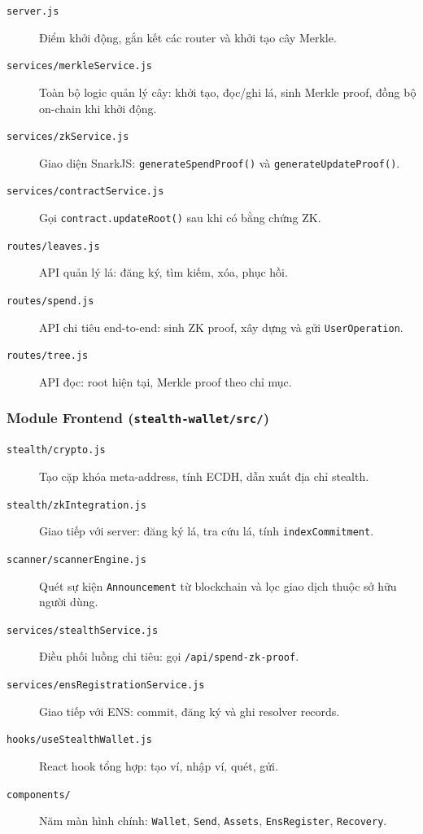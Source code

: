 \documentclass[../DoAn.tex]{subfiles}
\begin{document}
\begin{description}
    \item[\texttt{server.js}] Điểm khởi động, gắn kết các router và khởi tạo cây Merkle.
    \item[\texttt{services/merkleService.js}] Toàn bộ logic quản lý cây: khởi tạo, đọc/ghi lá, sinh Merkle proof, đồng bộ on-chain khi khởi động.
    \item[\texttt{services/zkService.js}] Giao diện SnarkJS: \texttt{generateSpendProof()} và \texttt{generateUpdateProof()}.
    \item[\texttt{services/contractService.js}] Gọi \texttt{contract.updateRoot()} sau khi có bằng chứng ZK.
    \item[\texttt{routes/leaves.js}] API quản lý lá: đăng ký, tìm kiếm, xóa, phục hồi.
    \item[\texttt{routes/spend.js}] API chi tiêu end-to-end: sinh ZK proof, xây dựng và gửi \texttt{UserOperation}.
    \item[\texttt{routes/tree.js}] API đọc: root hiện tại, Merkle proof theo chỉ mục.
\end{description}

\subsubsection{Module Frontend (\texttt{stealth-wallet/src/})}

\begin{description}
    \item[\texttt{stealth/crypto.js}] Tạo cặp khóa meta-address, tính ECDH, dẫn xuất địa chỉ stealth.
    \item[\texttt{stealth/zkIntegration.js}] Giao tiếp với server: đăng ký lá, tra cứu lá, tính \texttt{indexCommitment}.
    \item[\texttt{scanner/scannerEngine.js}] Quét sự kiện \texttt{Announcement} từ blockchain và lọc giao dịch thuộc sở hữu người dùng.
    \item[\texttt{services/stealthService.js}] Điều phối luồng chi tiêu: gọi \texttt{/api/spend-zk-proof}.
    \item[\texttt{services/ensRegistrationService.js}] Giao tiếp với ENS: commit, đăng ký và ghi resolver records.
    \item[\texttt{hooks/useStealthWallet.js}] React hook tổng hợp: tạo ví, nhập ví, quét, gửi.
    \item[\texttt{components/}] Năm màn hình chính: \texttt{Wallet}, \texttt{Send}, \texttt{Assets}, \texttt{EnsRegister}, \texttt{Recovery}.
\end{description}
\end{document}
